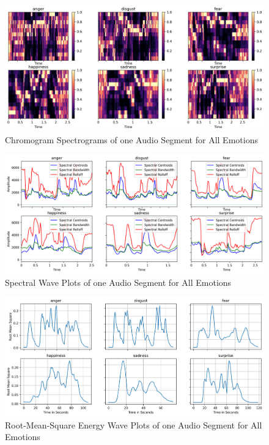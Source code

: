 \begin{figure}[H]
	\centering
	\includegraphics[width=.9\linewidth]{figs/appendix/feature_selection/ChromSpec.png}
	\caption{Chromogram Spectrograms of one Audio Segment for All Emotions}
	\label{fig:ChromSpec}
\end{figure}

\begin{figure}[H]
	\centering
	\includegraphics[width=.9\linewidth]{figs/appendix/feature_selection/specWP.png}
	\caption{Spectral Wave Plots of one Audio Segment for All Emotions}
	\label{fig:SpecWP}
\end{figure}

\begin{figure}[H]
	\centering
	\includegraphics[width=.9\linewidth]{figs/appendix/feature_selection/rmseWP.png}
	\caption{Root-Mean-Square Energy Wave Plots of one Audio Segment for All Emotions}
	\label{fig:rmseWP}
\end{figure}


